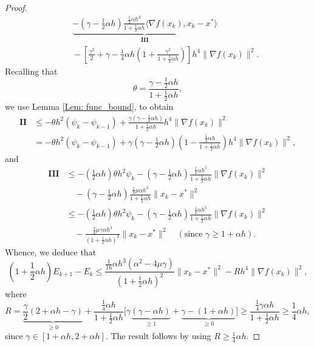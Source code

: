 \documentclass[pdflatex,sn-mathphys-num]{sn-jnl}
\theoremstyle{thmstyleone}
\theoremstyle{thmstyletwo}
\theoremstyle{thmstylethree}
\begin{document}
\begin{appendices}
\begin{proof}
\begin{align*}
&\quad \underbrace{ - \left( \gamma - \frac{1}{2}\alpha h \right)\frac{ \frac{1}{2}\alpha h^3 }{1+\frac{1}{2}\alpha h}\langle \nabla f(x_k), x_k-x^* \rangle }_{\mathbf{III}} \\
&\quad -\left[ \frac{\gamma^2}{2} + \gamma - \frac{1}{4}\alpha h \left( 1 + \frac{\gamma^2}{1+\frac{1}{2}\alpha h} \right) \right] h^4 \| \nabla f(x_k) \|^2.
\end{align*}
Recalling that
$$ \theta = \frac{ \gamma-\frac{1}{2}\alpha h }{1 + \frac{1}{2}\alpha h}, $$
we use Lemma \ref{Lem: func_bound}, to obtain
\begin{align*}
\mathbf{II}
&\le - \theta h^2 (\psi_k-\psi_{k-1}) + \frac{ \gamma\left(\gamma-\frac{1}{2}\alpha h \right)}{1 + \frac{1}{2}\alpha h} h^4 \| \nabla f(x_k) \|^2 \\
&= - \theta h^2 (\psi_k-\psi_{k-1}) + \gamma\left(\gamma-\frac{1}{2}\alpha h \right)\left( 1 - \frac{ \frac{1}{2}\alpha h }{1 + \frac{1}{2}\alpha h} \right) h^4 \| \nabla f(x_k) \|^2, 
\end{align*}
and
\begin{align*}
\mathbf{III}
&\le - \left( \frac{1}{2}\alpha h \right)\theta h^2 \psi_k 
  - \left( \gamma - \frac{1}{2}\alpha h \right)\frac{ \frac{1}{4}\alpha h^5 }{1+\frac{1}{2}\alpha h}\| \nabla f(x_k) \|^2 \\ 
&\quad - \left( \gamma - \frac{1}{2}\alpha h \right)\frac{ \frac{1}{4}\mu\alpha h^3 }{1+\frac{1}{2}\alpha h}\| x_k-x^* \|^2 \\
&\le 
  - \left( \frac{1}{2}\alpha h \right)\theta h^2 \psi_k 
  - \left( \gamma - \frac{1}{2}\alpha h \right)\frac{ \frac{1}{4}\alpha h^5 }{1+\frac{1}{2}\alpha h}\| \nabla f(x_k) \|^2 \\ 
&\quad - \frac{ \frac{1}{4}\mu\gamma\alpha h^3 }{\left(1+\frac{1}{2}\alpha h \right)^2}\| x_k-x^* \|^2 
   \quad( \text{since }\gamma\ge1+\alpha h ).
\end{align*}
Whence, we deduce that
$$ \left( 1 + \frac{1}{2}\alpha h \right)E_{k+1} - E_k
\le \frac{\frac{1}{16}\alpha h^3 (\alpha^2-4\mu\gamma)}{\left( 1+\frac{1}{2}\alpha h \right)^2}\| x_k - x^* \|^2 - Rh^4\| \nabla f(x_k) \|^2,  $$
where
$$ R= \underbrace{ \frac{\gamma}{2}(2+\alpha h-\gamma) }_{\ge 0} + \frac{\frac{1}{4}\alpha h}{1+\frac{1}{2}\alpha h}\big[ \gamma \underbrace{ (\gamma-\alpha h) }_{\ge 1} + \underbrace{ \gamma - (1+\alpha h) }_{\ge 0} \big] 
\ge \frac{\frac{1}{4}\gamma \alpha h}{1+\frac{1}{2}\alpha h}
\ge \frac{1}{4}\alpha h, $$
since $\gamma\in[1+\alpha h, 2+\alpha h]$. The result follows by using $R\ge \frac{1}{4}\alpha h$.
\end{proof}



\end{appendices}
\end{document}
